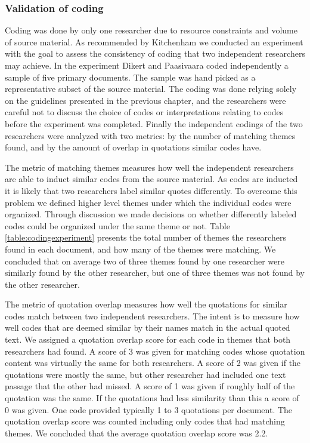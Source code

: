 \documentclass[preprint,authoryear,12pt]{elsarticle}
\begin{document}
\clearpage

\subsubsection{Validation of coding}

Coding was done by only one researcher due to resource constraints and volume of
source material. As recommended by Kitchenham \cite{Kitchenham2007} we conducted
an experiment with the goal to assess the consistency of coding that two
independent researchers may achieve.
In the experiment Dikert and Paasivaara coded independently a sample of five
primary documents. The sample was hand picked as a representative subset of the
source material. The coding was done relying solely on the guidelines presented
in the previous chapter, and the researchers were careful not to discuss the
choice of codes or interpretations relating to codes before the experiment was
completed. Finally the independent codings of the two researchers were analyzed
with two metrics: by the number of matching themes found, and by the amount of
overlap in quotations similar codes have.

The metric of matching themes measures how well the independent researchers are
able to induct similar codes from the source material. As codes are inducted it
is likely that two researchers label similar quotes differently. To overcome
this problem we defined higher level themes under which the individual codes
were organized. Through discussion we made decisions on whether differently
labeled codes could be organized under the same theme or not. Table
\ref{table:codingexperiment} presents the total number of themes the researchers
found in each document, and how many of the themes were matching. We concluded
that on average two of three themes found by one researcher were similarly found
by the other researcher, but one of three themes was not found by the other
researcher.

The metric of quotation overlap measures how well the quotations for similar
codes match between two independent researchers. The intent is to measure how
well codes that are deemed similar by their names match in the actual quoted
text. We assigned a quotation overlap score for each code in themes that both
researchers had found. A score of 3 was given for matching codes whose quotation
content was virtually the same for both researchers. A score of 2 was given if
the quotations were mostly the same, but other researcher had included one text
passage that the other had missed. A score of 1 was given if roughly half of the
quotation was the same. If the quotations had less similarity than this a score
of 0 was given. One code provided typically 1 to 3 quotations per document. The
quotation overlap score was counted including only codes that had matching
themes. We concluded that the average quotation overlap score was 2.2.
\end{document}
